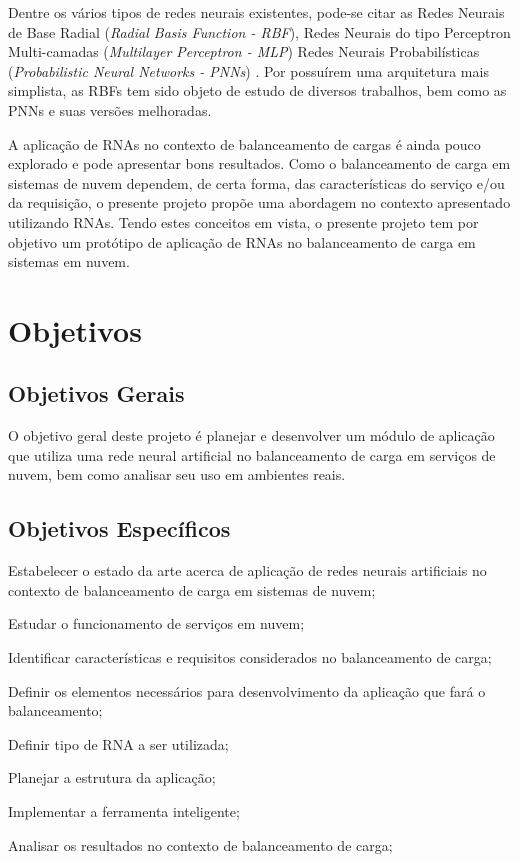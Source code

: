 Dentre os vários tipos de redes neurais existentes, pode-se citar as Redes Neurais de Base Radial (\textit{Radial Basis Function - RBF}), Redes Neurais do tipo Perceptron Multi-camadas (\textit{Multilayer Perceptron - MLP}) Redes Neurais Probabilísticas (\textit{Probabilistic Neural Networks - PNNs}) \cite{specht1990} \cite{specht1992}. Por possuírem uma arquitetura mais simplista, as RBFs tem sido objeto de estudo de diversos trabalhos, bem como as PNNs e suas versões melhoradas. 

A aplicação de RNAs no contexto de balanceamento de cargas é ainda pouco explorado e pode apresentar bons resultados. Como o balanceamento de carga em sistemas de nuvem dependem, de certa forma, das características do serviço e/ou da requisição, o presente projeto propõe uma abordagem no contexto apresentado utilizando RNAs. Tendo estes conceitos em vista, o presente projeto tem por objetivo um protótipo de aplicação de RNAs no balanceamento de carga em sistemas em nuvem. 


\section{Objetivos}\label{cap:objetivos-justificativa}

\subsection{Objetivos Gerais}\label{sec:objetivos-gerais}

O objetivo geral deste projeto é planejar e desenvolver um módulo de aplicação que utiliza uma rede neural artificial no balanceamento de carga em serviços de nuvem, bem como analisar seu uso em ambientes reais.


\subsection{Objetivos Específicos}\label{sec:objetivos-especificos}

\begin{alineas}
	\item Estabelecer o estado da arte acerca de aplicação de redes neurais artificiais no contexto de balanceamento de carga em sistemas de nuvem;
	\item Estudar o funcionamento de serviços em nuvem;
	\item Identificar características e requisitos considerados no balanceamento de carga;
	\item Definir os elementos necessários para desenvolvimento da aplicação que fará o balanceamento;
	\item Definir tipo de RNA a ser utilizada;
	\item Planejar a estrutura da aplicação;
	\item Implementar a ferramenta inteligente;
	\item Analisar os resultados no contexto de balanceamento de carga;
\end{alineas}


